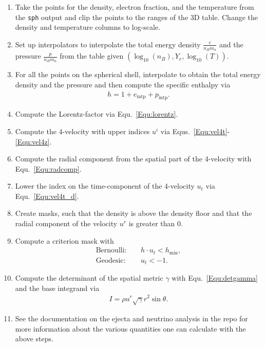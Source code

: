 \documentclass{article}
\newcommand{\var}[1]{%
  {\setlength{\fboxsep}{1.5pt}%
   \colorbox{varbg}{\textcolor{varfg}{\texttt{\small #1}}}}}
\begin{document}
\begin{enumerate}
  \item Take the points for the density, electron fraction, and the temperature from the \var{sph} output and clip the points
  to the ranges of the 3D table. Change the density and temperature columns to log-scale.
  \item Set up interpolators to interpolate the total energy density $\frac{e}{n_Bm_n}$ and the pressure $\frac{p}{n_Bm_n}$ from the table given $(\log_{10}(n_B),Y_e,\log_{10}(T))$.
  \item For all the points on the spherical shell, interpolate to obtain the total energy density and the pressure and then compute the
  specific enthalpy via
  \begin{align}
    h = 1+e_{\mathrm{intp}}+p_{\mathrm{intp}}.\nonumber
  \end{align}
  \item Compute the Lorentz-factor via Equ.~\eqref{Equ:lorentz}.
  \item Compute the 4-velocity with upper indices $u^i$ via Equs.~\eqref{Equ:vel4t}-\eqref{Equ:vel4z}.
  \item Compute the radial component from the spatial part of the 4-velocity with Equ.~\eqref{Equ:radcomp}.
  \item Lower the index on the time-component of the 4-velocity $u_t$ via Equ.~\eqref{Equ:vel4t_d}.
  \item Create masks, such that the density is above the density floor and that the radial component of the velocity
  $u^r$ is greater than 0.
  \item Compute a criterion mask with
  \begin{align}
    \mathrm{Bernoulli:}&\quad h\cdot u_t < h_{\mathrm{min}},\nonumber\\
    \mathrm{Geodesic:}&\quad u_t < -1.\nonumber
  \end{align}
  \item Compute the determinant of the spatial metric $\gamma$ with Equ.~\eqref{Equ:detgamma} and the base
  integrand via
  \begin{align}
    I = \rho u^r\sqrt{\gamma}r^2\sin{\theta}.\nonumber
  \end{align}
  \item See the documentation on the ejecta and neutrino analysis in the repo for more information about the various quantities one
  can calculate with the above steps.
\end{enumerate}
\end{document}
